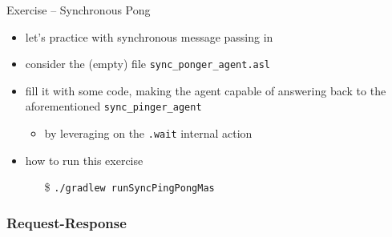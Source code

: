 \documentclass[presentation]{beamer}\mode<presentation>{\usetheme{AMSBolognaFC}}
\begin{document}

\startExercise
\begin{frame}[c, allowframebreaks]{Exercise \currentExercise{} -- Synchronous Pong}
    \begin{itemize}
        \item let's practice with synchronous message passing in \jason{}
        
        \vspace{.3cm}
        
        \item consider the (empty) file \texttt{sync\_ponger\_agent.asl}
        
        \vspace{.3cm}
        
        \item fill it with some \jason{} code, making the agent capable of answering back to the aforementioned \texttt{sync\_pinger\_agent}
        \begin{itemize}
            \item by leveraging on the \texttt{.wait} internal action
        \end{itemize}
        
        \vspace{.3cm}
        
        \item how to run this exercise
        \begin{itemize}
            \item[\$] \texttt{./gradlew run\alert{SyncPingPong}Mas}
        \end{itemize}
        
    \end{itemize}
\end{frame}

\subsubsection{Request-Response}
\end{document}
